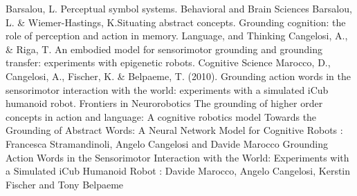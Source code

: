 \documentclass[12pt]{report}
\begin{document}
\begin{thebibliography}{9}
 Barsalou, L. Perceptual symbol systems. Behavioral and Brain Sciences
Barsalou, L. \& Wiemer-Hastings, K.Situating abstract concepts. Grounding cognition: the role of perception and action in memory. Language, and Thinking
Cangelosi, A., \& Riga, T. An embodied model for sensorimotor grounding
and grounding transfer: experiments with epigenetic robots. Cognitive Science
Marocco, D., Cangelosi, A., Fischer, K. \& Belpaeme, T. (2010). Grounding action
words in the sensorimotor interaction with the world: experiments with a
simulated iCub humanoid robot. Frontiers in Neurorobotics
\bibitem{}The grounding of higher order concepts in action and language: A cognitive robotics model
\bibitem{} Towards the Grounding of Abstract Words: A Neural Network Model for Cognitive Robots : Francesca Stramandinoli, Angelo Cangelosi and Davide Marocco
\bibitem{}Grounding Action Words in the Sensorimotor Interaction with the World: Experiments with a Simulated iCub Humanoid Robot : Davide Marocco, Angelo Cangelosi, Kerstin Fischer and Tony Belpaeme
	
\end{thebibliography}
\end{document}
